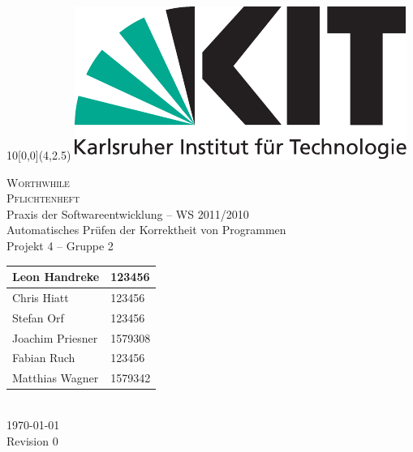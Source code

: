 
\newcommand{\diameter}{20}
\newcommand{\xone}{-15}
\newcommand{\xtwo}{160}
\newcommand{\yone}{15}
\newcommand{\ytwo}{-253}

\begin{titlepage}
	\begin{textblock}{10}[0,0](4,2.5)
		\includegraphics[width=.3\textwidth]{images/kit_logo_de_4c_positiv.pdf}
	\end{textblock}
	\vspace*{3.5cm}
	\begin{center}
		\fontsize{45}{50}\selectfont
  \textsc{Worthwhile} \\
  \textsc{Pflichtenheft}
		\vspace*{2cm}\\
		\LARGE
  Praxis der Softwareentwicklung -- WS 2011/2010 \\
  Automatisches Prüfen der Korrektheit von Programmen \\
  Projekt 4 -- Gruppe 2 \\
  \medskip
  \vspace*{2cm}
  \Large
  \begin{tabular}{|l|l|}
    \hline
    Leon Handreke & 123456 \\
    \hline
    Chris Hiatt & 123456 \\
    \hline
    Stefan Orf & 123456 \\
    \hline
    Joachim Priesner & 1579308 \\
    \hline
    Fabian Ruch & 123456 \\
    \hline
    Matthias Wagner & 1579342 \\
    \hline
  \end{tabular}
  \vspace*{2cm} \\
  \today \\
	Revision 0
	\end{center}
	\vspace*{1cm}


\end{titlepage}
